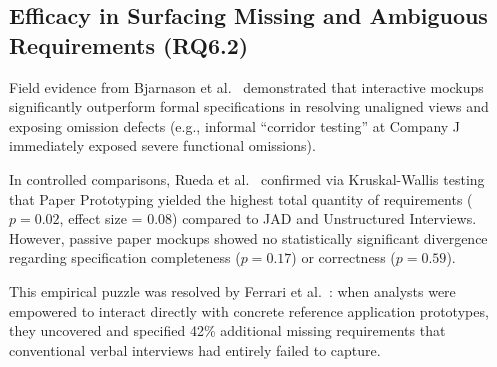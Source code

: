 \documentclass[conference]{IEEEtran}
\begin{document}
\subsection{Efficacy in Surfacing Missing and Ambiguous Requirements (RQ6.2)}
Field evidence from Bjarnason et al.~\cite{bjarnason2023empirically} demonstrated that interactive mockups significantly outperform formal specifications in resolving unaligned views and exposing omission defects (e.g., informal ``corridor testing'' at Company J immediately exposed severe functional omissions). 

In controlled comparisons, Rueda et al.~\cite{rueda2020requirements} confirmed via Kruskal-Wallis testing that Paper Prototyping yielded the highest total quantity of requirements ($p = 0.02$, effect size = $0.08$) compared to JAD and Unstructured Interviews. However, passive paper mockups showed no statistically significant divergence regarding specification completeness ($p = 0.17$) or correctness ($p = 0.59$). 

This empirical puzzle was resolved by Ferrari et al.~\cite{rej2022evolve}: when analysts were empowered to interact directly with concrete reference application prototypes, they uncovered and specified 42\% additional missing requirements that conventional verbal interviews had entirely failed to capture.
\end{document}
